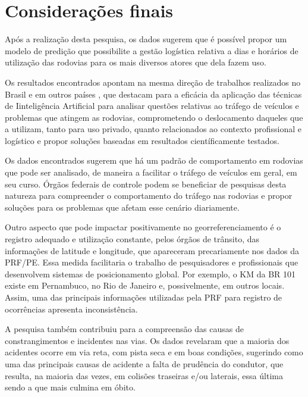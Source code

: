 \chapter{Considerações finais}\label{intro:resumen}

Após a realização desta pesquisa, os dados sugerem que é possível propor um modelo de predição que possibilite a gestão logística relativa a dias e horários de utilização das rodovias para os mais diversos atores que dela fazem uso.  

Os resultados encontrados apontam na mesma direção de trabalhos realizados no Brasil e em outros países  \cite{dos2016previsao} \cite{chong2004traffic} \cite{akgungor2009artificial} \cite{jadaan2014prediction} , que destacam para a eficácia da aplicação das técnicas de Iinteligência Artificial para analisar questões relativas ao tráfego de veículos e problemas que atingem as rodovias, comprometendo o deslocamento daqueles que a utilizam, tanto para uso privado, quanto relacionados ao contexto profissional e logístico e propor soluções baseadas em resultados científicamente testados. 

Os dados encontrados sugerem que há um padrão de comportamento em rodovias que pode ser analisado, de maneira a facilitar o tráfego de veículos em geral, em seu curso. 
Órgãos federais de controle podem se beneficiar de pesquisas desta natureza para compreender o comportamento do tráfego nas rodovias e propor soluções para os problemas que afetam esse cenário diariamente. 

Outro aspecto que pode impactar positivamente no georreferenciamento é o registro adequado e utilização constante, pelos órgãos de trânsito, das informações de latitude e longitude, que apareceram precariamente nos dados da PRF/PE. Essa medida facilitaria o trabalho de pesquisadores e profissionais que desenvolvem sistemas de posicionamento global. Por exemplo, o KM da BR 101 existe em Pernambuco, no Rio de Janeiro e, possivelmente, em outros locais. Assim, uma das principais informações utilizadas pela PRF para registro de ocorrências apresenta inconsistência.     

A pesquisa também contribuiu para a compreensão das causas de constrangimentos e incidentes nas vias. Os dados revelaram que a maioria dos acidentes ocorre em via reta, com pista seca e em boas condições, sugerindo como uma das principais causas de acidente a falta de prudência do condutor, que resulta, na maioria das vezes, em colisões traseiras e/ou laterais, essa última sendo a que mais culmina em óbito. 

